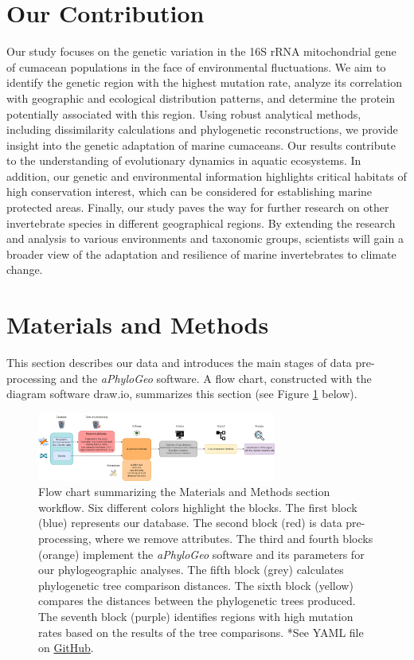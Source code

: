 \section{Our Contribution}\label{contribution}

Our study focuses on the genetic variation in the 16S rRNA mitochondrial gene of cumacean populations in the face of environmental fluctuations. We aim to identify the genetic region with the highest mutation rate, analyze its correlation with geographic and ecological distribution patterns, and determine the protein potentially associated with this region. Using robust analytical methods, including dissimilarity calculations and phylogenetic reconstructions, we provide insight into the genetic adaptation of marine cumaceans. Our results contribute to the understanding of evolutionary dynamics in aquatic ecosystems. In addition, our genetic and environmental information highlights critical habitats of high conservation interest, which can be considered for establishing marine protected areas. Finally, our study paves the way for further research on other invertebrate species in different geographical regions. By extending the research and analysis to various environments and taxonomic groups, scientists will gain a broader view of the adaptation and resilience of marine invertebrates to climate change.

\section{Materials and Methods}\label{materials-methods}
This section describes our data and introduces the main stages of data pre-processing and the \textit{aPhyloGeo} software. A flow chart, constructed with the diagram software draw.io, summarizes this section (see Figure \ref{fig:fig1} below).

\begin{figure}[htbp]
    \centering
    \includegraphics[width=0.7\textwidth]{diagram.drawio.png}
    \caption{Flow chart summarizing the Materials and Methods section workflow. Six different colors highlight the blocks. The first block (blue) represents our database. The second block (red) is data pre-processing, where we remove attributes. The third and fourth blocks (orange) implement the \textit{aPhyloGeo} software and its parameters for our phylogeographic analyses. The fifth block (grey) calculates phylogenetic tree comparison distances. The sixth block (yellow) compares the distances between the phylogenetic trees produced. The seventh block (purple) identifies regions with high mutation rates based on the results of the tree comparisons. *See YAML file on \href{https://github.com/tahiri-lab/aPhyloGeo}{GitHub}. \label{fig:fig1}}
\end{figure}


